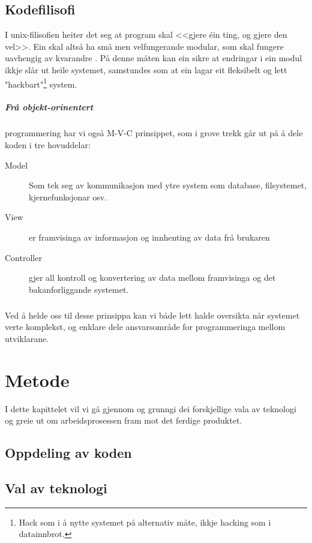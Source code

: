 \documentclass[nynorsk,12pt,a4paper,oneside]{book}
\begin{document}
\section{Kodefilisofi}
I unix-filisofien heiter det seg at program skal <<gjere éin ting, og gjere den vel>>. Ein skal altså ha små men velfungerande modular, som skal fungere uavhengig av kvarandre \cite{unixprog}. På denne måten kan ein sikre at endringar i ein modul ikkje slår ut heile systemet, samstundes som at ein lagar eit fleksibelt og lett "hackbart"\footnote{Hack som i å nytte systemet på alternativ måte, ikkje hacking som i datainnbrot.} system. 

\paragraph{Frå objekt-orinentert} programmering har vi også M-V-C prinsippet, som i grove trekk går ut på å dele koden i tre hovuddelar: \cite{mvc}

\begin{description}
	\item[Model] Som tek seg av kommunikasjon med ytre system som database, filsystemet, kjernefunksjonar osv.
	\item[View] er framvisinga av informasjon og innhenting av data frå brukaren
	\item[Controller] gjer all kontroll og konvertering av data mellom framvisinga og det bakanforliggande systemet.
\end{description}

\paragraph{}
Ved å helde oss til desse prinsippa kan vi både lett halde oversikta når systemet verte komplekst, og enklare dele ansvarsområde for programmeringa mellom utviklarane.

\chapter{Metode}
I dette kapittelet vil vi gå gjennom og grunngi dei forskjellige vala av teknologi og greie ut om arbeidsprosessen fram mot det ferdige produktet. 
 
\section{Oppdeling av koden}


\section{Val av teknologi}
\end{document}
